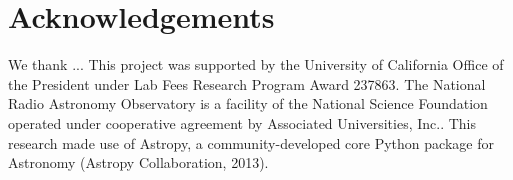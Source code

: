 \documentclass[twocolumn]{aastex61}
\begin{document}
\section*{Acknowledgements}
We thank ...
This project was supported by the University of California Office of the President under Lab Fees Research Program Award 237863. The National Radio Astronomy Observatory is a facility of the National Science Foundation operated under cooperative agreement by Associated Universities, Inc.. This research made use of Astropy, a community-developed core Python package for Astronomy (Astropy Collaboration, 2013).




\end{document}
